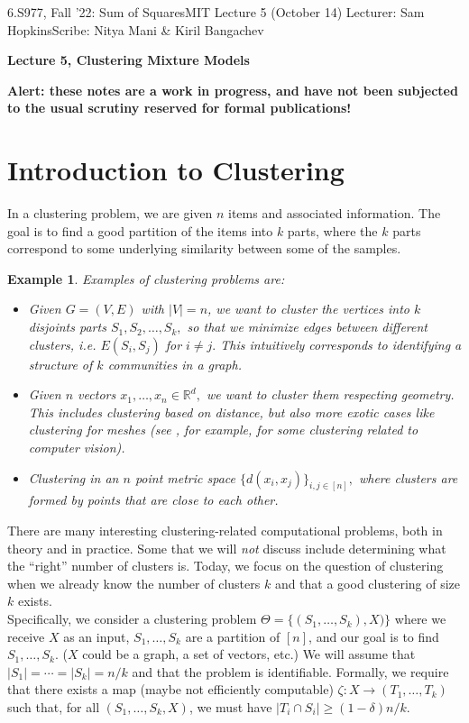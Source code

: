 \documentclass[12pt]{article}%
\date{}
\author{}
\newtheorem{example}[theorem]{Example}
\def\lecturer{Sam Hopkins}
\def\coursenum{6.S977, Fall ’22}
\def\coursename{Sum of Squares}
\newlength{\tpush}
\newcommand{\lecturenotes}[3]{\noindent\vspace*{-\tpush}\newline\parbox{\textwidth}
	{\coursenum : \coursename \hfill MIT \newline
		Lecture #1 (#2) \newline
		Lecturer: \lecturer \hfill Scribe: #3 \newline
		\mbox{}\hrulefill\mbox{}}\vspace*{1ex}\mbox{}\newline
	\bigskip
	\begin{center}{\Large\bf  Lecture #1, Clustering Mixture Models}\end{center}
	\bigskip}
\begin{document}
\lecturenotes{5}{October 14}{Nitya Mani \& Kiril Bangachev}

\textbf{Alert: these notes are a work in progress, and have not been subjected to the usual scrutiny reserved for formal publications!}

\section{Introduction to Clustering}
In a clustering problem, we are given $n$ items and associated information. The goal is to find a good partition of the items into $k$ parts, where the $k$ parts correspond to some underlying similarity between some of the samples. 

\begin{example}
\normalfont Examples of clustering problems are:
\begin{itemize}
    \item Given $G = (V, E)$ with $|V| = n$, we want to cluster the vertices into $k$ disjoints parts 
    $S_1, S_2, \ldots, S_k,$ so that we minimize edges between different clusters, i.e.
     $E(S_i, S_j)$ for $i \neq j.$ This intuitively corresponds to identifying a structure of $k$ communities in a graph. 
    \item Given $n$ vectors $x_1, \ldots, x_n \in \mathbb{R}^d,$ we want to cluster them respecting geometry. This includes clustering based on distance, but also more exotic cases like clustering for meshes (see \cite{Fan2009MeshCB}, for example, for some clustering related to computer vision).
    \item Clustering in an $n$ point metric space $\{d(x_i, x_j)\}_{i,j \in [n]},$ where clusters are formed by points that are close to each other.
\end{itemize}
\end{example}
\noindent
There are many interesting clustering-related computational problems, both in theory and in practice. Some that we will \textit{not} discuss include determining what the ``right'' number of clusters is. Today, we focus on the question of clustering when we already know the number of clusters $k$ and that a good clustering of size $k$ exists.\\

\noindent
Specifically, we consider a clustering problem $\Theta = \{(S_1, \ldots, S_k), X) \}$ where we receive $X$ as an input, $S_1,\ldots,S_k$ are a partition of $[n]$, and our goal is to find $S_1, \ldots, S_k$. ($X$ could be a graph, a set of vectors, etc.) We will assume that $|S_1| = \cdots = |S_k| = n/k$ and that the problem is identifiable. Formally, we require that there exists a map (maybe not efficiently computable)
$\zeta: X \longrightarrow (T_1, \ldots, T_k)$ such that, for all $(S_1, \ldots, S_k, X)$, we must have $|T_i \cap S_i| \ge (1 -\delta) n/k.$
\end{document}
